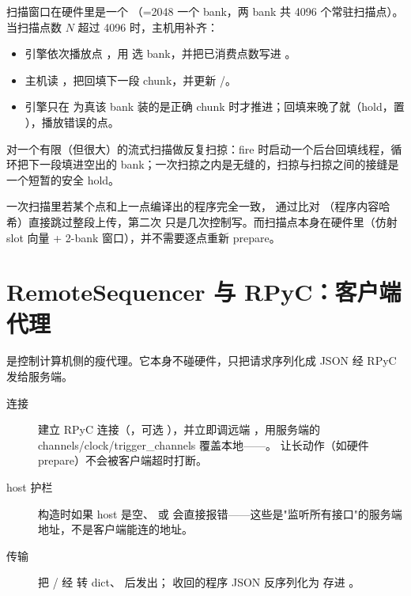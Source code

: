 \documentclass[11pt,oneside,openany]{book}
\begin{document}
扫描窗口在硬件里是一个 （=2048 一个 bank，两 bank 共 4096 个常驻扫描点）。当扫描点数 $N$ 超过 4096 时，主机用补齐：

\begin{itemize}
\item 引擎依次播放点 ，用  选 bank，并把已消费点数写进 。
\item 主机读 ，把回填下一段 chunk，并更新 /。
\item 引擎只在  为真该 bank 装的是正确 chunk 时才推进；回填来晚了就（hold，置 ），播放错误的点。
\end{itemize}

 对一个有限（但很大）的流式扫描做反复扫掠：fire 时启动一个后台回填线程，循环把下一段填进空出的 bank；一次扫掠之内是无缝的，扫掠与扫掠之间的接缝是一个短暂的安全 hold。

\begin{notebox}
一次扫描里若某个点和上一点编译出的程序完全一致， 通过比对 （程序内容哈希）直接跳过整段上传，第二次  只是几次控制写。而扫描点本身在硬件里（仿射 slot 向量 + 2-bank 窗口），并不需要逐点重新 prepare。
\end{notebox}

\section{RemoteSequencer 与 RPyC：客户端代理}

 是控制计算机侧的瘦代理。它本身不碰硬件，只把请求序列化成 JSON 经 RPyC 发给服务端。

\begin{description}
\item[连接]  建立 RPyC 连接（，可选 ），并立即调远端 ，用服务端的 channels/clock/trigger\_channels 覆盖本地——。 让长动作（如硬件 prepare）不会被客户端超时打断。
\item[host 护栏] 构造时如果 host 是空、 或 \pyapi{::} 会直接报错——这些是"监听所有接口"的服务端地址，不是客户端能连的地址。
\item[传输]  把 / 经  转 dict、 后发出； 收回的程序 JSON 反序列化为  存进 。
\end{description}
\end{document}
